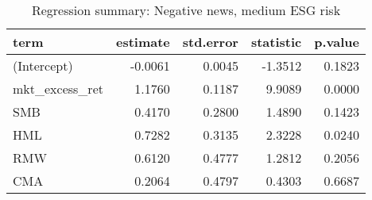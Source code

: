\begin{table}[H]
\caption{Regression summary: Negative news, medium ESG risk}
\centering
\begin{tabular}{lrrrr}
  \hline
term & estimate & std.error & statistic & p.value \\ 
  \hline
(Intercept) & -0.0061 & 0.0045 & -1.3512 & 0.1823 \\ 
  mkt\_excess\_ret & 1.1760 & 0.1187 & 9.9089 & 0.0000 \\ 
  SMB & 0.4170 & 0.2800 & 1.4890 & 0.1423 \\ 
  HML & 0.7282 & 0.3135 & 2.3228 & 0.0240 \\ 
  RMW & 0.6120 & 0.4777 & 1.2812 & 0.2056 \\ 
  CMA & 0.2064 & 0.4797 & 0.4303 & 0.6687 \\ 
   \hline
\end{tabular}
\end{table}

